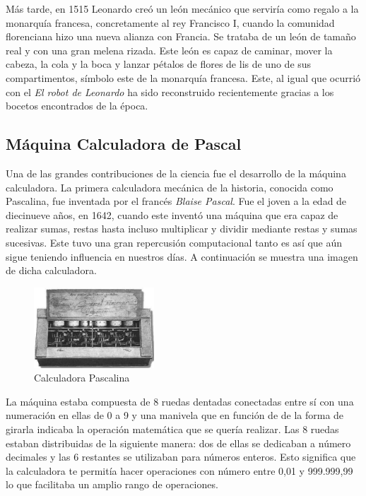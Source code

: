 Más tarde, en 1515 Leonardo creó un león mecánico que serviría como regalo a la monarquía francesa, concretamente al rey Francisco I, cuando la comunidad florenciana hizo una nueva alianza con Francia. Se trataba de un león de tamaño real y con una gran melena rizada. Este león es capaz de caminar, mover la cabeza, la cola y la boca y lanzar pétalos de flores de lis de uno de sus compartimentos, símbolo este de la monarquía francesa. Este, al igual que ocurrió con el \textit{El robot de Leonardo} ha sido reconstruido recientemente gracias a los bocetos encontrados de la época.


\subsection{Máquina Calculadora de Pascal}

Una de las grandes contribuciones de la ciencia fue el desarrollo de la máquina calculadora. La primera calculadora mecánica de la historia, conocida como Pascalina, fue inventada por el francés \textit{Blaise Pascal}. Fue el joven a la edad de diecinueve años, en 1642, cuando este inventó una máquina que era capaz de realizar sumas, restas hasta incluso multiplicar y dividir mediante restas y sumas sucesivas. Este tuvo una gran repercusión computacional tanto es así que aún sigue teniendo influencia en nuestros días. A continuación se muestra una imagen de dicha calculadora.

\begin{figure}[H]
\begin{center}
  \includegraphics[width=0.4\textwidth]{./EtapaPrimeriza/imagenes/cp.jpg}
  \caption{Calculadora Pascalina}
  \label{cp}
\end{center}
\end{figure}

La máquina estaba compuesta de 8 ruedas dentadas conectadas entre sí con una numeración en ellas de 0 a 9 y una manivela que en función de de la forma de girarla indicaba la operación matemática que se quería realizar. Las 8 ruedas estaban distribuidas de la siguiente manera: dos de ellas se dedicaban a número decimales y las 6 restantes se utilizaban para números enteros. Esto significa que la calculadora te permitía hacer operaciones con número entre 0,01 y 999.999,99 lo que facilitaba un amplio rango de operaciones.\\

